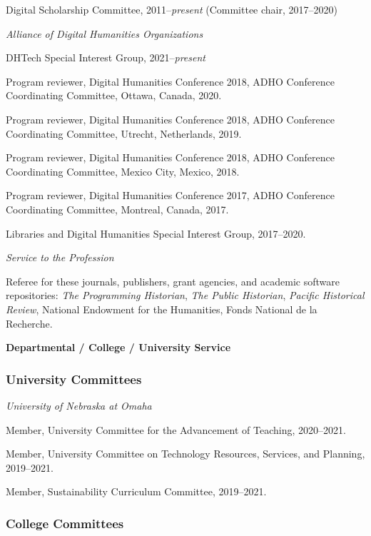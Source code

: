 Digital Scholarship Committee, 2011--\emph{present} (Committee chair,
2017--2020)

\vspace{.4cm}

\emph{Alliance of Digital Humanities Organizations}

DHTech Special Interest Group, 2021--\emph{present}

Program reviewer, Digital Humanities Conference 2018, ADHO Conference
Coordinating Committee, Ottawa, Canada, 2020.

Program reviewer, Digital Humanities Conference 2018, ADHO Conference
Coordinating Committee, Utrecht, Netherlands, 2019.

Program reviewer, Digital Humanities Conference 2018, ADHO Conference
Coordinating Committee, Mexico City, Mexico, 2018.

Program reviewer, Digital Humanities Conference 2017, ADHO Conference
Coordinating Committee, Montreal, Canada, 2017.

Libraries and Digital Humanities Special Interest Group, 2017--2020.

\vspace{.4cm}

\emph{Service to the Profession}

Referee for these journals, publishers, grant agencies, and academic
software repositories: \emph{The Programming Historian}, \emph{The
Public Historian}, \emph{Pacific Historical Review}, National Endowment
for the Humanities, Fonds National de la Recherche.

\vspace{.4cm}

\textbf{Departmental / College / University Service}

\hypertarget{university-committees}{%
\subsubsection{University Committees}\label{university-committees}}

\emph{University of Nebraska at Omaha}

Member, University Committee for the Advancement of Teaching,
2020--2021.

Member, University Committee on Technology Resources, Services, and
Planning, 2019--2021.

Member, Sustainability Curriculum Committee, 2019--2021.

\hypertarget{college-committees}{%
\subsubsection{College Committees}\label{college-committees}}

